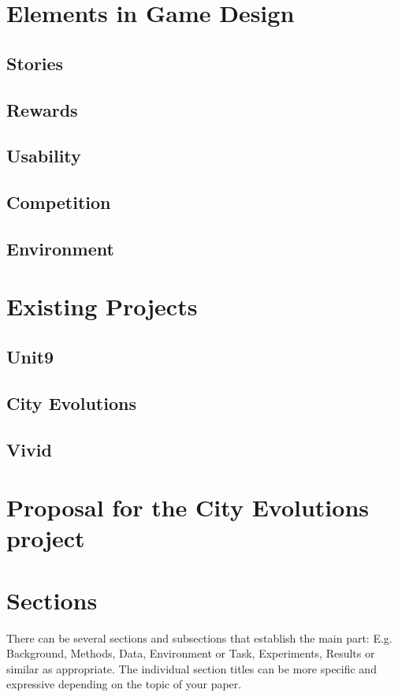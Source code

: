 \documentclass[a4,12pt]{article}
\begin{document}
\section{Elements in Game Design}

\subsection{Stories}

\subsection{Rewards}
\subsection{Usability}
\subsection{Competition}
\subsection{Environment}
\section{Existing Projects}
\subsection{Unit9}
\subsection{City Evolutions}
\subsection{Vivid}
\section{Proposal for the City Evolutions project}
\section{Sections}
%
There can be several sections and subsections that establish the main part: E.g. Background, Methods, Data, Environment or Task, Experiments, Results or similar as appropriate. The individual section titles can be more specific and expressive depending on the topic of your paper. 
\end{document}
